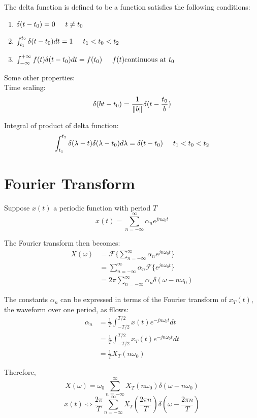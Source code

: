 \documentclass{article}
\begin{document}
The delta function is defined to be a function satisfies the following conditions:
\begin{enumerate}
\item $\delta(t - t_0) = 0 \hspace{0.5cm} t \neq t_0$
\item $\int_{t_1}^{t_2} \delta(t - t_0)dt =1 \hspace{0.5cm} t_1 < t_0 < t_2$
\item $\int_{- \infty}^{+ \infty} f(t) \delta(t - t_0)dt = f(t_0) \hspace{0.5cm} f(t) \text{continuous at }t_0$
\end{enumerate}

\bigskip
Some other properties:\\
Time scaling:
$$ \delta(bt - t_0) = \frac{1}{\left\Vert b\right\Vert} \delta(t - \frac{t_0}{b}) $$

Integral of product of delta function:
$$ \int_{t_1}^{t_2} \delta(\lambda - t) \delta(\lambda - t_0)d \lambda = \delta(t - t_0) \hspace{0.5cm} t_1 < t_0 < t_2 $$

\section{Fourier Transform}
Suppose $x(t)$ a periodic function with period $T$
$$ x(t) = \sum_{n = - \infty}^{\infty} \alpha_n e^{jn\omega_0 t} $$

The Fourier transform then becomes:
$$
\begin{aligned}
		X(\omega) & = \mathcal{F}\{\sum_{n = - \infty}^{\infty} \alpha_n e^{jn\omega_0 t}\} \\
				  & =  \sum_{n = - \infty}^{\infty} \alpha_n \mathcal{F}\{e^{jn\omega_0 t}\} \\
				  & =  2\pi \sum_{n = - \infty}^{\infty} \alpha_n \delta(\omega - n \omega_0)
\end{aligned}
$$

The constants $\alpha_n$ can be expressed in terms of the Fourier transform of $x_T(t)$, the waveform over one period, as fllows:
$$
\begin{aligned}
		\alpha_n & = \frac{1}{T} \int_{ - T/2}^{T/2} x(t) e^{-jn\omega_0 t}dt \\
			     & = \frac{1}{T} \int_{ - T/2}^{T/2} x_T(t) e^{-jn\omega_0 t}dt \\
  				   & = \frac{1}{T} X_T(n\omega_0)
\end{aligned}
$$

Therefore, 
$$ X(\omega) = \omega_0 \sum_{n = - \infty}^{\infty} X_T(n\omega_0)\delta(\omega - n \omega_0) $$
$$ x(t) \Leftrightarrow \frac{2\pi}{T} \sum_{n = - \infty}^{\infty} X_T(\frac{2\pi n}{T})\delta(\omega - \frac{2\pi n}{T}) $$
\end{document}
